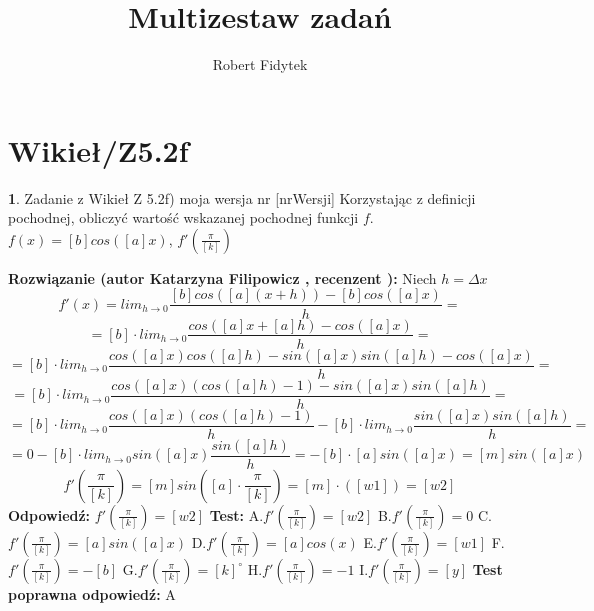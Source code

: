 \documentclass[12pt, a4paper]{article}
\title{Multizestaw zadań}
\author{Robert Fidytek}
\date{}
\theoremstyle{definition} %
\newtheorem{zad}{}
\newcommand{\kategoria}[1]{\section{#1}} %
\newcommand{\zadStart}[1]{\begin{zad}#1\newline} %
\newcommand{\zadStop}{\end{zad}}   %
\newcommand{\rozwStart}[2]{\noindent \textbf{Rozwiązanie (autor #1 , recenzent #2): }\newline} %
\newcommand{\rozwStop}{\newline}                                            %
\newcommand{\odpStart}{\noindent \textbf{Odpowiedź:}\newline}    %
\newcommand{\odpStop}{\newline}                                             %
\newcommand{\testStart}{\noindent \textbf{Test:}\newline} %
\newcommand{\testStop}{\newline} %
\newcommand{\kluczStart}{\noindent \textbf{Test poprawna odpowiedź:}\newline} %
\newcommand{\kluczStop}{\newline} %
\begin{document}
\maketitle


\kategoria{Wikieł/Z5.2f}
\zadStart{Zadanie z Wikieł Z 5.2f) moja wersja nr [nrWersji]}
Korzystając z definicji pochodnej, obliczyć wartość wskazanej pochodnej funkcji $f$.\\
 $f(x)=[b]cos([a]x)$, $f'(\frac{\pi}{[k]})$
\zadStop
\rozwStart{Katarzyna Filipowicz}{}
Niech $h=\Delta x$
$$
f'(x)=lim_{h\rightarrow 0} \frac{[b]cos([a](x+h))-[b]cos([a]x)}{h}=
$$ $$
=[b] \cdot lim_{h\rightarrow 0} \frac{cos([a]x+[a]h)-cos([a]x)}{h}=
$$ $$
=[b]\cdot lim_{h\rightarrow 0} \frac{cos([a]x)cos([a]h)-sin([a]x)sin([a]h)-cos([a]x)}{h}=
$$ $$
=[b]\cdot lim_{h\rightarrow 0} \frac{cos([a]x)(cos([a]h)-1)-sin([a]x)sin([a]h)}{h}=
$$ $$
=[b]\cdot lim_{h\rightarrow 0} \frac{cos([a]x)(cos([a]h)-1)}{h}-[b]\cdot lim_{h\rightarrow 0}  \frac{sin([a]x)sin([a]h)}{h}=
$$ $$
=0-[b]\cdot lim_{h\rightarrow 0} sin([a]x)\frac{sin([a]h)}{h}=-[b]\cdot [a]sin([a]x)=[m]sin([a]x)
$$ $$
f'\left(\frac{\pi}{[k]}\right)=[m]sin\left([a]\cdot \frac{\pi}{[k]}\right)=[m] \cdot ([w1])=[w2]
$$
\rozwStop
\odpStart
$f'(\frac{\pi}{[k]})=[w2]$
\odpStop
\testStart
A.$f'(\frac{\pi}{[k]})=[w2]$
B.$f'(\frac{\pi}{[k]})=0$
C.$f'(\frac{\pi}{[k]})=[a]sin([a]x)$
D.$f'(\frac{\pi}{[k]})=[a]cos(x)$
E.$f'(\frac{\pi}{[k]})=[w1]$
F.$f'(\frac{\pi}{[k]})=-[b]$
G.$f'(\frac{\pi}{[k]})=[k]^{\circ}$
H.$f'(\frac{\pi}{[k]})=-1$
I.$f'(\frac{\pi}{[k]})=[y]$
\testStop
\kluczStart
A
\kluczStop
\end{document}
